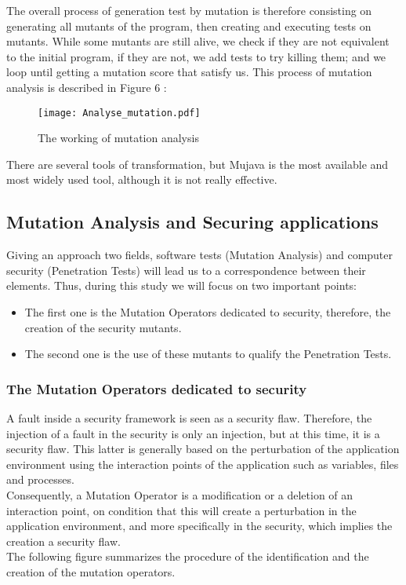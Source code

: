 \documentclass{acm_proc_article-sp}
\begin{document}
The overall process of generation test by mutation is therefore consisting on generating all mutants of the program, then creating and executing tests on mutants. While some mutants are still alive, we check if they are not equivalent to the initial program, if they are not, we add tests to try killing them; and we loop until getting a mutation score that satisfy us. This process of mutation analysis is described in Figure 6 :
\begin{figure}[h!]                                                       \centering                                                               \texttt{[image: Analyse\_mutation.pdf]}     \caption{The working of mutation analysis}                               \label{The working of mutation analysis}                                 \end{figure}                                                             There are several tools of transformation, but Mujava is the most available and most widely used tool, although it is not really effective.

\subsection{Mutation Analysis and Securing applications}
Giving an approach two fields, software tests (Mutation Analysis) and computer security (Penetration Tests) will lead us to a correspondence between their elements. Thus, during this study we will focus on two important points:
\begin{itemize}
\item The first one is the Mutation Operators dedicated to security, therefore, the creation of the security mutants.
\item The second one is the use of these mutants to qualify the Penetration Tests.
\end{itemize}

\subsubsection{The Mutation Operators dedicated to security}
A fault inside a security framework is seen as a security flaw. Therefore, the injection of a fault in the security is only an injection, but at this time, it is a security flaw. This latter is generally based on the perturbation of the application environment using the interaction points of the application such as variables, files and processes.\\
Consequently, a Mutation Operator is a modification or a deletion of an interaction point, on condition that this will create a perturbation in the application environment, and more specifically in the security, which implies the creation a security flaw.\\
The following figure summarizes the procedure of the identification and the creation of the mutation operators.
\end{document}
